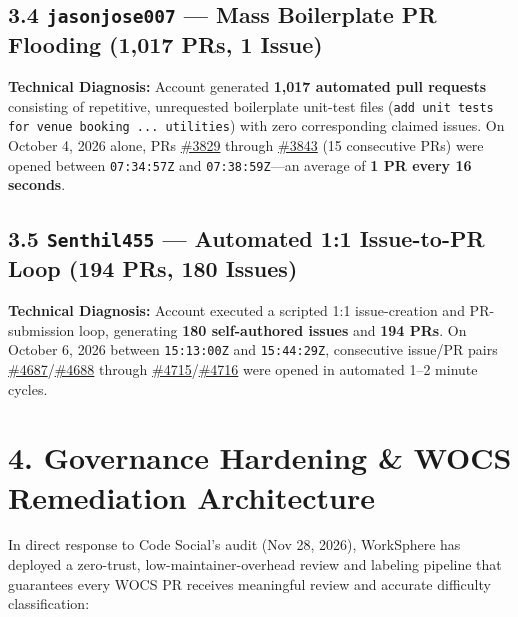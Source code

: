 \documentclass[11pt,a4paper]{article}
\begin{document}
\subsection{3.4 \texttt{jasonjose007} — Mass Boilerplate PR Flooding (1,017 PRs, 1 Issue)}
\textbf{Technical Diagnosis:} Account generated \textbf{1,017 automated pull requests} consisting of repetitive, unrequested boilerplate unit-test files (\texttt{add unit tests for venue booking ... utilities}) with zero corresponding claimed issues. On October 4, 2026 alone, PRs \href{https://github.com/SatyamPandey-07/WorkSphere/pull/3829}{\#3829} through \href{https://github.com/SatyamPandey-07/WorkSphere/pull/3843}{\#3843} (15 consecutive PRs) were opened between \texttt{07:34:57Z} and \texttt{07:38:59Z}—an average of \textbf{1 PR every 16 seconds}.

\subsection{3.5 \texttt{Senthil455} — Automated 1:1 Issue-to-PR Loop (194 PRs, 180 Issues)}
\textbf{Technical Diagnosis:} Account executed a scripted 1:1 issue-creation and PR-submission loop, generating \textbf{180 self-authored issues} and \textbf{194 PRs}. On October 6, 2026 between \texttt{15:13:00Z} and \texttt{15:44:29Z}, consecutive issue/PR pairs \href{https://github.com/SatyamPandey-07/WorkSphere/issues/4687}{\#4687}/\href{https://github.com/SatyamPandey-07/WorkSphere/pull/4688}{\#4688} through \href{https://github.com/SatyamPandey-07/WorkSphere/issues/4715}{\#4715}/\href{https://github.com/SatyamPandey-07/WorkSphere/pull/4716}{\#4716} were opened in automated 1--2 minute cycles.

\section{4. Governance Hardening \& WOCS Remediation Architecture}
In direct response to Code Social's audit (Nov 28, 2026), WorkSphere has deployed a zero-trust, low-maintainer-overhead review and labeling pipeline that guarantees every WOCS PR receives meaningful review and accurate difficulty classification:
\end{document}
